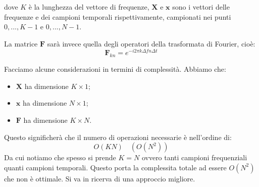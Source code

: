 \documentclass[11pt,a4paper]{article}
\begin{document}
dove $K$ è la lunghezza del vettore di frequenze, $\mathbf{X}$ e $\mathbf{x}$ 
sono i vettori delle frequenze e dei campioni temporali rispettivamente, campionati nei punti 
$0, ..., K - 1$ e $0, ..., N - 1$.

La matrice $\mathbf{F}$ sarà invece quella degli operatori della trasformata di Fourier, cioè:
$$
\mathbf{F}_{kn} = e^{- i 2 \pi k \Delta f n \Delta t}
$$

Facciamo alcune considerazioni in termini di complessità. Abbiamo che:
\begin{itemize}
	\item $\mathbf{X}$ ha dimensione $K \times 1$;
	\item $\mathbf{x}$ ha dimensione $N \times 1$;
	\item $\mathbf{F}$ ha dimensione $K \times N$.
\end{itemize}
Questo significherà che il numero di operazioni necessarie è nell'ordine di:
$$
O(KN) \quad \left( O(N^2) \right)
$$
Da cui notiamo che spesso si prende $K = N$ ovvero tanti campioni frequenziali 
quanti campioni temporali. Questo porta la complessita totale ad essere $O(N^2)$ 
che non è ottimale. Si va in ricerva di una approccio migliore. 
\end{document}
